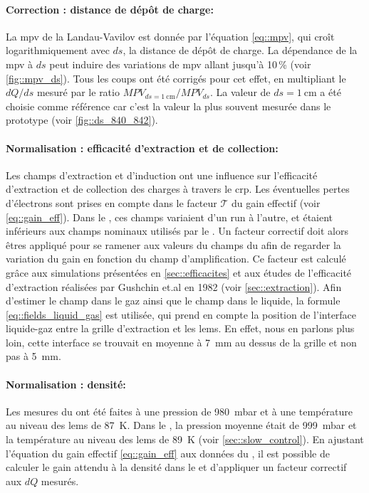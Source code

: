         \paragraph{Correction : distance de dépôt de charge:} La \gls{mpv} de la Landau-Vavilov est donnée par l'équation \eqref{eq::mpv}, qui croît logarithmiquement avec $ds$, la distance de dépôt de charge. La dépendance de la \gls{mpv} à $ds$ peut induire des variations de \gls{mpv} allant jusqu'à 10\,\% (voir \autoref{fig::mpv_ds}). Tous les coups ont été corrigés pour cet effet, en multipliant le $dQ/ds$ mesuré par le ratio $MPV_{ds=\SI{1}{\centi\meter}}/MPV_{ds}$. La valeur de $ds=\SI{1}{\centi\meter}$ a été choisie comme référence car c'est la valeur la plus souvent mesurée dans le prototype (voir \autoref{fig::ds_840_842}).

        \paragraph{Normalisation : efficacité d'extraction et de collection:} Les champs d'extraction et d'induction ont une influence sur l'efficacité d'extraction et de collection des charges à travers le \gls{crp}. Les éventuelles pertes d'électrons sont prises en compte dans le facteur $\mathcal{T}$ du gain effectif (voir \autoref{eq::gain_eff}). Dans le \TOO{}, ces champs variaient d'un run à l'autre, et étaient inférieurs aux champs nominaux utilisés par le \threeL{}. Un facteur correctif doit alors êtres appliqué pour se ramener aux valeurs du champs du \threeL{} afin de regarder la variation du gain en fonction du champ d'amplification. Ce facteur est calculé grâce aux simulations présentées en \autoref{sec::efficacites} et aux études de l'efficacité d'extraction réalisées par Gushchin et.al en 1982\cite{guschin} (voir \autoref{sec::extraction}). Afin d'estimer le champ dans le gaz ainsi que le champ dans le liquide, la formule \eqref{eq::fields_liquid_gas} est utilisée, qui prend en compte la position de l'interface liquide-gaz entre la grille d'extraction et les \glspl{lem}. En effet, nous en parlons plus loin, cette interface se trouvait en moyenne à \SI{7}{\milli\meter} au dessus de la grille et non pas à \SI{5}{\milli\meter}.

        \paragraph{Normalisation : densité:} Les mesures du \threeL{} ont été faites à une pression de \SI{980}{\milli\bar} et à une température au niveau des \glspl{lem} de \SI{87}{\kelvin}. Dans le \TOO{}, la pression moyenne était de \SI{999}{\milli\bar} et la température au niveau des \glspl{lem} de \SI{89}{\kelvin} (voir \autoref{sec::slow_control}). En ajustant l'équation du gain effectif \eqref{eq::gain_eff} aux données du \threeL{}, il est possible de calculer le gain attendu à la densité dans le \TOO{} et d'appliquer un facteur correctif aux $dQ$ mesurés.

